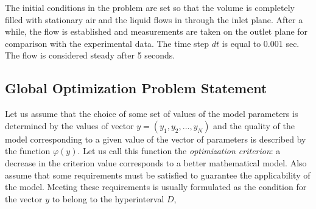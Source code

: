 \documentclass[mathematics,article,submit,pdftex,moreauthors]{Definitions/mdpi}
\begin{document}

The initial conditions in the problem are set so that the volume is completely filled with stationary air and the liquid flows in through the inlet plane. After a while, the flow is established and measurements are taken on the outlet plane for comparison with the experimental data. The time step $dt$ is equal to 0.001 sec. The flow is considered steady after 5 seconds.















\subsection{Global Optimization Problem Statement}
Let us assume that the choice of some set of values of the model parameters is determined by the values of vector $y=(y_1,y_2,...,y_N)$ and the quality of the model corresponding to a given value of the vector of parameters is described by the function $\varphi(y)$. Let us call this function the \textit{optimization criterion}: a decrease in the criterion value corresponds to a better mathematical model. Also assume that some requirements must be satisfied to guarantee the applicability of the model. Meeting these requirements is usually formulated as the condition for the vector $y$ to belong to the hyperinterval $D$,
\end{document}
